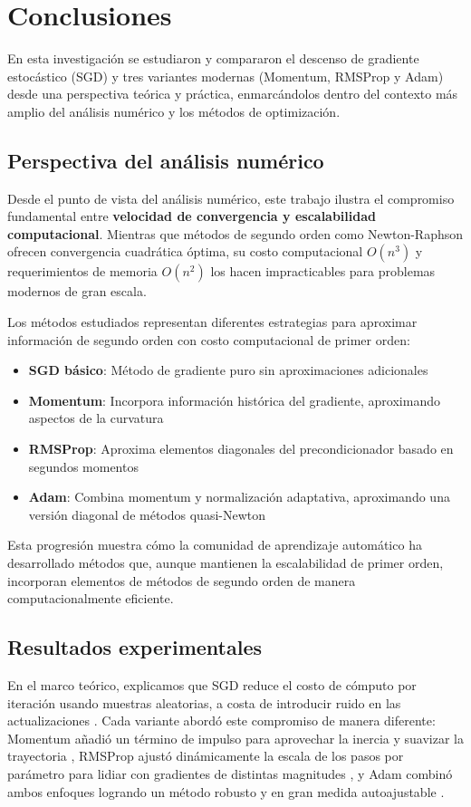 \documentclass[12pt, spanish]{article}
\begin{document}
\section{Conclusiones}
En esta investigación se estudiaron y compararon el descenso de gradiente estocástico (SGD) y tres variantes modernas (Momentum, RMSProp y Adam) desde una perspectiva teórica y práctica, enmarcándolos dentro del contexto más amplio del análisis numérico y los métodos de optimización.

\subsection{Perspectiva del análisis numérico}
Desde el punto de vista del análisis numérico, este trabajo ilustra el compromiso fundamental entre \textbf{velocidad de convergencia y escalabilidad computacional}. Mientras que métodos de segundo orden como Newton-Raphson ofrecen convergencia cuadrática óptima, su costo computacional $O(n^3)$ y requerimientos de memoria $O(n^2)$ los hacen impracticables para problemas modernos de gran escala.

Los métodos estudiados representan diferentes estrategias para aproximar información de segundo orden con costo computacional de primer orden:
\begin{itemize}
\item \textbf{SGD básico}: Método de gradiente puro sin aproximaciones adicionales
\item \textbf{Momentum}: Incorpora información histórica del gradiente, aproximando aspectos de la curvatura
\item \textbf{RMSProp}: Aproxima elementos diagonales del precondicionador basado en segundos momentos
\item \textbf{Adam}: Combina momentum y normalización adaptativa, aproximando una versión diagonal de métodos quasi-Newton
\end{itemize}

Esta progresión muestra cómo la comunidad de aprendizaje automático ha desarrollado métodos que, aunque mantienen la escalabilidad de primer orden, incorporan elementos de métodos de segundo orden de manera computacionalmente eficiente.

\subsection{Resultados experimentales}
En el marco teórico, explicamos que SGD reduce el costo de cómputo por iteración usando muestras aleatorias, a costa de introducir ruido en las actualizaciones \cite{ref1}. Cada variante abordó este compromiso de manera diferente: Momentum añadió un término de impulso para aprovechar la inercia y suavizar la trayectoria \cite{ref4}, RMSProp ajustó dinámicamente la escala de los pasos por parámetro para lidiar con gradientes de distintas magnitudes \cite{ref3}, y Adam combinó ambos enfoques logrando un método robusto y en gran medida autoajustable \cite{ref2}.
\end{document}

